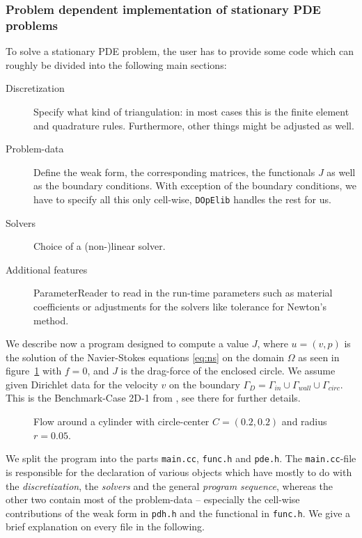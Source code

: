 \documentclass[smallextended]{svjour3}       %
\numberwithin{equation}{section}
\newcommand{\dope}{\texttt{DOpElib}}
\begin{document}
\subsubsection{Problem dependent implementation of stationary PDE problems}
To solve a stationary PDE problem, the user has to provide some code which can roughly be divided into the following main sections:
\begin{description}
\item[Discretization] Specify what kind of triangulation:
in most cases this is the
finite element and quadrature rules. Furthermore, other
things might be adjusted as well.
\item[Problem-data] Define the weak form, the corresponding matrices, the
  functionals $J$ as well as the boundary conditions. With exception of the boundary conditions, we have to specify all this only cell-wise, \dope{} handles the rest for us.
\item[Solvers] Choice of a (non-)linear solver. 
\item[Additional features] ParameterReader to read in the run-time parameters
  such as material coefficients or adjustments for the solvers like tolerance
  for Newton's method. 
\end{description} 

We describe now a program designed to compute a value $J$, where $u=(v,p)$ is the solution of the Navier-Stokes equations \eqref{eq:ns} on the domain $\Omega$ as seen in figure~\ref{fig:example_ns} with  $f=0$, and $J$ is the drag-force of the enclosed circle. We assume given Dirichlet data for the velocity $v$ on the boundary $\Gamma_{D}=\Gamma_{in}\cup\Gamma_{wall}\cup\Gamma_{circ}$. This is the Benchmark-Case 2D-1 from \cite{TuSchae96}, see there for further details.
\begin{figure}[h]
\centering
\resizebox{0.5\textwidth}{!}{}
\caption{Flow around a cylinder with 
circle-center $C=(0.2,0.2)$ and radius $r=0.05$.}
\label{fig:example_ns}
\end{figure}

We split the program into the parts \texttt{main.cc}, \texttt{func.h} and \texttt{pde.h}. The \texttt{main.cc}-file is responsible for the declaration of various objects which have mostly to do with the \textit{discretization}, the \textit{solvers} and the general \textit{program sequence}, whereas the other two contain most of the problem-data -- especially the cell-wise contributions of the weak form in \texttt{pdh.h} and the functional in \texttt{func.h}. 
We give a brief explanation on every file in the following.
\end{document}
